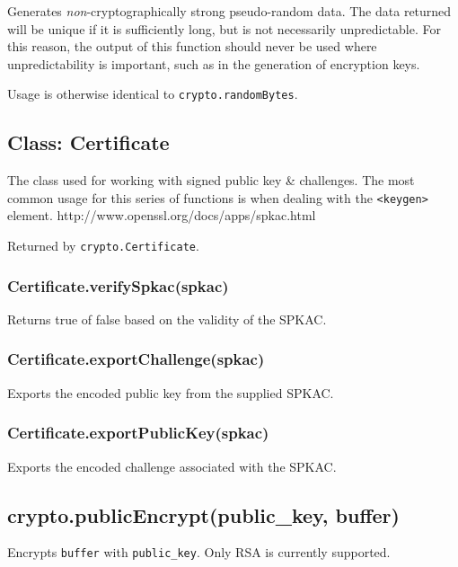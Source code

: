 Generates \emph{non}-cryptographically strong pseudo-random data. The
data returned will be unique if it is sufficiently long, but is not
necessarily unpredictable. For this reason, the output of this function
should never be used where unpredictability is important, such as in the
generation of encryption keys.

Usage is otherwise identical to \texttt{crypto.randomBytes}.

\subsection{Class: Certificate}\label{class-certificate}

The class used for working with signed public key \& challenges. The
most common usage for this series of functions is when dealing with the
\texttt{\textless{}keygen\textgreater{}} element.
http://www.openssl.org/docs/apps/spkac.html

Returned by \texttt{crypto.Certificate}.

\subsubsection{Certificate.verifySpkac(spkac)}\label{certificate.verifyspkacspkac}

Returns true of false based on the validity of the SPKAC.

\subsubsection{Certificate.exportChallenge(spkac)}\label{certificate.exportchallengespkac}

Exports the encoded public key from the supplied SPKAC.

\subsubsection{Certificate.exportPublicKey(spkac)}\label{certificate.exportpublickeyspkac}

Exports the encoded challenge associated with the SPKAC.

\subsection{crypto.publicEncrypt(public\_key,
buffer)}\label{crypto.publicencryptpublicux5fkey-buffer}

Encrypts \texttt{buffer} with \texttt{public\_key}. Only RSA is
currently supported.


